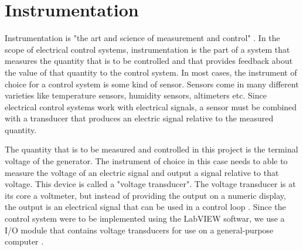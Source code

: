 \section{Instrumentation}
Instrumentation is "the art and science of measurement and control" \cite{heitkamp}. In the scope of electrical control systems, instrumentation is the part of a system that measures the quantity that is to be controlled and that provides feedback about the value of that quantity to the control system. In most cases, the instrument of choice for a control system is some kind of sensor. Sensors come in many different varieties like temperature sensors, humidity sensors, altimeters etc. Since electrical control systems work with electrical signals, a sensor must be combined with a transducer that produces an electric signal relative to the measured quantity.

The quantity that is to be measured and controlled in this project is the terminal voltage of the generator. The instrument of choice in this case needs to able to measure the voltage of an electric signal and output a signal relative to that voltage. This device is called a "voltage transducer". The voltage transducer is at its core a voltmeter, but instead of providing the output on a numeric display, the output is an electrical signal that can be used in a control loop \cite{systematic}. Since the control system were to be implemented using the LabVIEW softwar, we use a I/O module that contains voltage transducers for use on a general-purpose computer \cite{labview}.


